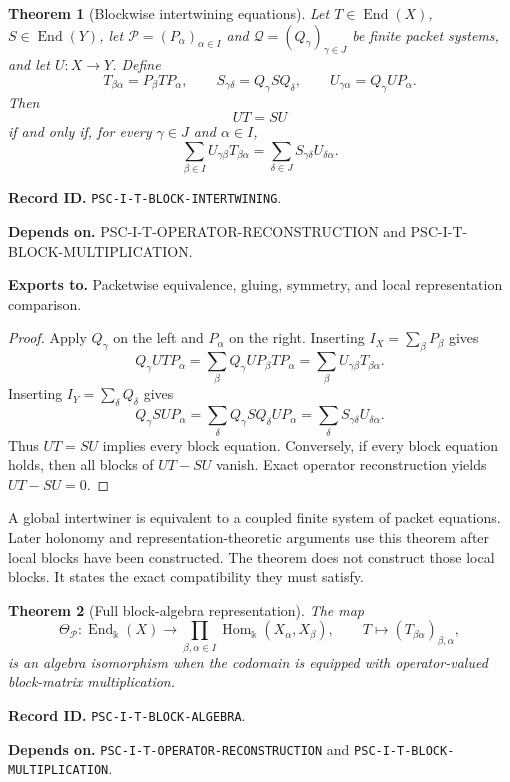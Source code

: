 \documentclass[11pt]{article}
\newtheorem{theorem}{Theorem}[section]
\theoremstyle{definition}
\theoremstyle{remark}
\newcommand{\bbk}{\Bbbk}
\newcommand{\Pcal}{\mathcal P}
\newcommand{\Qcal}{\mathcal Q}
\newcommand{\End}{\operatorname{End}}
\newcommand{\Hom}{\operatorname{Hom}}
\newcommand{\RecordID}[1]{\par\smallskip\noindent\begingroup\footnotesize\color{PSCGray}\raggedright\textbf{Record ID.} \nolinkurl{#1}.\par\endgroup}
\newcommand{\Depends}[1]{\par\noindent\begingroup\footnotesize\color{PSCGray}\raggedright\textbf{Depends on.} #1\par\endgroup}
\newcommand{\Exports}[1]{\par\noindent\begingroup\footnotesize\color{PSCGray}\raggedright\textbf{Exports to.} #1\par\endgroup}
\begin{document}
\begin{theorem}[Blockwise intertwining equations]
\label{thm:block-intertwining}
Let \(T\in\End(X)\), \(S\in\End(Y)\), let \(\Pcal=(P_\alpha)_{\alpha\in I}\) and \(\Qcal=(Q_\gamma)_{\gamma\in J}\) be finite packet systems, and let \(U:X\to Y\).  Define
\[
T_{\beta\alpha}=P_\beta TP_\alpha,
\qquad
S_{\gamma\delta}=Q_\gamma SQ_\delta,
\qquad
U_{\gamma\alpha}=Q_\gamma UP_\alpha.
\]
Then
\[
\boxed{UT=SU}
\]
if and only if, for every \(\gamma\in J\) and \(\alpha\in I\),
\[
\boxed{
\sum_{\beta\in I}U_{\gamma\beta}T_{\beta\alpha}
=
\sum_{\delta\in J}S_{\gamma\delta}U_{\delta\alpha}.
}
\]
\end{theorem}
\RecordID{PSC-I-T-BLOCK-INTERTWINING}
\Depends{PSC-I-T-OPERATOR-RECONSTRUCTION and PSC-I-T-BLOCK-MULTIPLICATION.}
\Exports{Packetwise equivalence, gluing, symmetry, and local representation comparison.}

\begin{proof}
Apply \(Q_\gamma\) on the left and \(P_\alpha\) on the right.  Inserting \(I_X=\sum_\beta P_\beta\) gives
\[
Q_\gamma UTP_\alpha
=
\sum_\beta Q_\gamma UP_\beta TP_\alpha
=
\sum_\beta U_{\gamma\beta}T_{\beta\alpha}.
\]
Inserting \(I_Y=\sum_\delta Q_\delta\) gives
\[
Q_\gamma SUP_\alpha
=
\sum_\delta Q_\gamma SQ_\delta UP_\alpha
=
\sum_\delta S_{\gamma\delta}U_{\delta\alpha}.
\]
Thus \(UT=SU\) implies every block equation.  Conversely, if every block equation holds, then all blocks of \(UT-SU\) vanish.  Exact operator reconstruction yields \(UT-SU=0\).
\end{proof}

\begin{interpretation}
A global intertwiner is equivalent to a coupled finite system of packet equations.  Later holonomy and representation-theoretic arguments use this theorem after local blocks have been constructed.  The theorem does not construct those local blocks.  It states the exact compatibility they must satisfy.
\end{interpretation}


\begin{theorem}[Full block-algebra representation]
\label{thm:block-algebra}
The map
\[
\Theta_{\Pcal}:\End_{\bbk}(X)
\longrightarrow
\prod_{\beta,\alpha\in I}\Hom_{\bbk}(X_\alpha,X_\beta),
\qquad
T\longmapsto(T_{\beta\alpha})_{\beta,\alpha},
\]
is an algebra isomorphism when the codomain is equipped with operator-valued block-matrix multiplication.
\end{theorem}
\RecordID{PSC-I-T-BLOCK-ALGEBRA}
\Depends{\nolinkurl{PSC-I-T-OPERATOR-RECONSTRUCTION} and
\nolinkurl{PSC-I-T-BLOCK-MULTIPLICATION}.}
\end{document}
